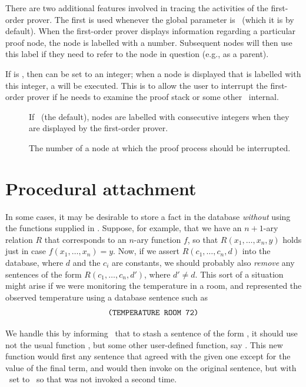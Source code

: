 There are two additional features involved in tracing the activities
of the first-order prover.  The first is used whenever the global
parameter  is \T\ (which it is by default).  When
the first-order prover displays information regarding a particular
proof node, the node is labelled with a number.  Subsequent nodes
will then use this label if they need to refer to the node in
question (e.g., as a parent).

If  is \T, then  can be set
to an integer; when a node is displayed that is labelled with this
integer, a  will be executed.  This is to allow the
user to interrupt the first-order prover if he needs to examine the
proof stack or some other \mvl\ internal.

 \begin{description}
 \item [] If \T\ (the default), nodes are
labelled with consecutive integers when they are displayed by the
first-order prover.
 \item [] The number of a node at which the
proof process should be interrupted.
 \end{description}

\section{Procedural attachment}
\label{s.attach}

In some cases, it may be desirable to store a fact in the database
{\em without\/} using the functions supplied in \mvl.  Suppose, for
example, that we have an $n+1$-ary relation $R$ that corresponds to
an $n$-ary function $f$, so that $R(x_1,\dots,x_n,y)$ holds just in
case $f(x_1,\dots,x_n)=y$.  Now, if we assert $R(c_1,\dots,c_n,d)$
into the database, where $d$ and the $c_i$ are constants, we should
probably also {\em remove\/} any sentences of the form
$R(c_1,\dots,c_n,d')$, where $d'\neq d$.  This sort of a situation
might arise if we were monitoring the temperature in a room, and
represented the observed temperature using a database sentence such
as
 \begin{equation}
\mbox{\tt (TEMPERATURE ROOM 72)}
\label{e.temp}
\end{equation}

We handle this by informing \mvl\ that to stash a sentence of the
form , it should use not the usual function
, but some other user-defined function, say
.  This new function would first 
any sentence that agreed with the given one except for the value of
the final term, and would then invoke  on the original
sentence, but with \apa\ set to \NIL\ so that  was
not invoked a second time.

